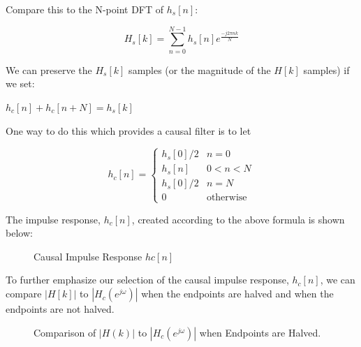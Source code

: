 \documentclass[fleqn]{article}
\begin{document}
	Compare this to the N-point DFT of $h_s[n]$:
			
	\begin{equation*}
		H_s[k] = \sum_{n=0}^{N-1}{h_s[n]e^{\frac{-j2{\pi}nk}{N}}}
	\end{equation*}
			
	We can preserve the $H_s[k]$ samples (or the magnitude of the $H[k]$ samples) if we set:
			
	$h_c[n] + h_c[n+N] = h_s[k]$
			
	One way to do this which provides a causal filter is to let
			
	\begin{equation*}
		h_c[n] = \begin{cases}
			h_s[0]/2 & n = 0\\
			h_s[n]   & 0 < n < N\\
			h_s[0]/2 & n = N\\
			0		 & \text{otherwise}
		\end{cases}
	\end{equation*}
			
	The impulse response, $h_c[n]$, created according to the above formula is shown below:
			
	\begin{figure}[H]
		\centerline{}
		\caption{Causal Impulse Response $hc[n]$}
	\end{figure}
			
	To further emphasize our selection of the causal impulse response, $h_c[n]$, we can compare $|H[k]|$ to $|H_c(e^{j\omega})|$ when the endpoints are halved and when the endpoints are not halved.
			
	\begin{figure}[H]
		\centerline{}
		\caption{\doublespacing Comparison of $|H(k)|$ to $|H_c(e^{j\omega})|$ when Endpoints are Halved.}
		\label{freq_response_halved_endpoints}
	\end{figure}
			
\end{document}
